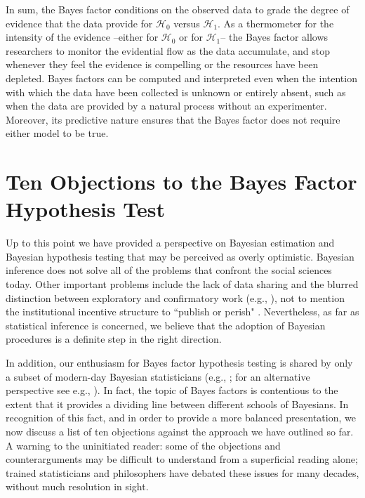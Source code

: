 In sum, the Bayes factor conditions on the observed data to grade the degree of evidence that the data provide for $\mathcal{H}_0$ versus $\mathcal{H}_1$. As a thermometer for the intensity of the evidence --either for $\mathcal{H}_0$ or for $\mathcal{H}_1$-- the Bayes factor allows researchers to monitor the evidential flow as the data accumulate, and stop whenever they feel the evidence is compelling or the resources have been depleted. Bayes factors can be computed and interpreted even when the intention with which the data have been collected is unknown or entirely absent, such as when the data are provided by a natural process without an experimenter. Moreover, its predictive nature ensures that the Bayes factor does not require either model to be true.

\section{Ten Objections to the Bayes Factor Hypothesis Test}
Up to this point we have provided a perspective on Bayesian estimation and Bayesian hypothesis testing that may be perceived as overly optimistic. Bayesian inference does not solve all of the problems that confront the social sciences today. Other important problems include the lack of data sharing and the blurred distinction between exploratory and confirmatory work (e.g., ), not to mention the institutional incentive structure to ``publish or perish" \cite{NosekEtAl2012Utopia2}. Nevertheless, as far as statistical inference is concerned, we believe that the adoption of Bayesian procedures is a definite step in the right direction.

In addition, our enthusiasm for Bayes factor hypothesis testing is shared by only a subset of modern-day Bayesian statisticians (e.g., ; for an alternative perspective see e.g., ). In fact, the topic of Bayes factors is contentious to the extent that it provides a dividing line between different schools of Bayesians. In recognition of this fact, and in order to provide a more balanced presentation, we now discuss a list of ten objections against the approach we have outlined so far. A warning to the uninitiated reader: some of the objections and counterarguments may be difficult to understand from a superficial reading alone; trained statisticians and philosophers have debated these issues for many decades, without much resolution in sight.

